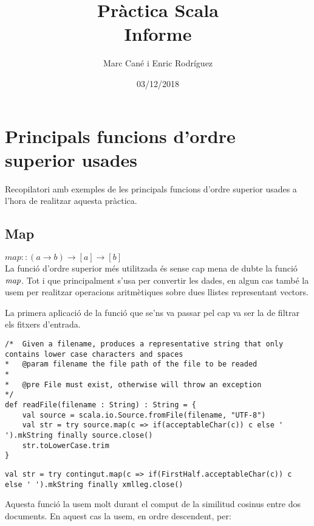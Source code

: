 \documentclass{report}
\begin{document}
\title{Pràctica Scala \\ Informe}
\author{Marc Cané i Enric Rodríguez}
\date{03/12/2018}
\maketitle

\newpage
\tableofcontents

\newpage
\chapter{Principals funcions d'ordre superior usades}
Recopilatori amb exemples de les principals funcions d'ordre superior usades a l'hora de realitzar aquesta pràctica.

\section{Map}

$ map :: (a \rightarrow b) \rightarrow [a] \rightarrow [b] $ \\

La funció d'ordre superior més utilitzada és sense cap mena de dubte la funció $ \emph{map} $. Tot i que principalment s'usa per convertir les dades, en algun cas també la usem per realitzar operacions aritmètiques sobre dues llistes representant vectors.

La primera aplicació de la funció que se'ns va passar pel cap va ser la de filtrar els fitxers d'entrada.

\begin{lstlisting}[style=scalaHighlight]
/*	Given a filename, produces a representative string that only contains lower case characters and spaces
* 	@param filename the file path of the file to be readed
* 	
* 	@pre File must exist, otherwise will throw an exception
*/
def readFile(filename : String) : String = {
	val source = scala.io.Source.fromFile(filename, "UTF-8")
	val str = try source.map(c => if(acceptableChar(c)) c else ' ').mkString finally source.close()
	str.toLowerCase.trim
}
\end{lstlisting}

\begin{lstlisting}[style=scalaHighlight]
val str = try contingut.map(c => if(FirstHalf.acceptableChar(c)) c else ' ').mkString finally xmlleg.close()
\end{lstlisting}

\newpage

Aquesta funció la usem molt durant el comput de la similitud cosinus entre dos documents. En aquest cas la usem, en ordre descendent, per:
\end{document}
